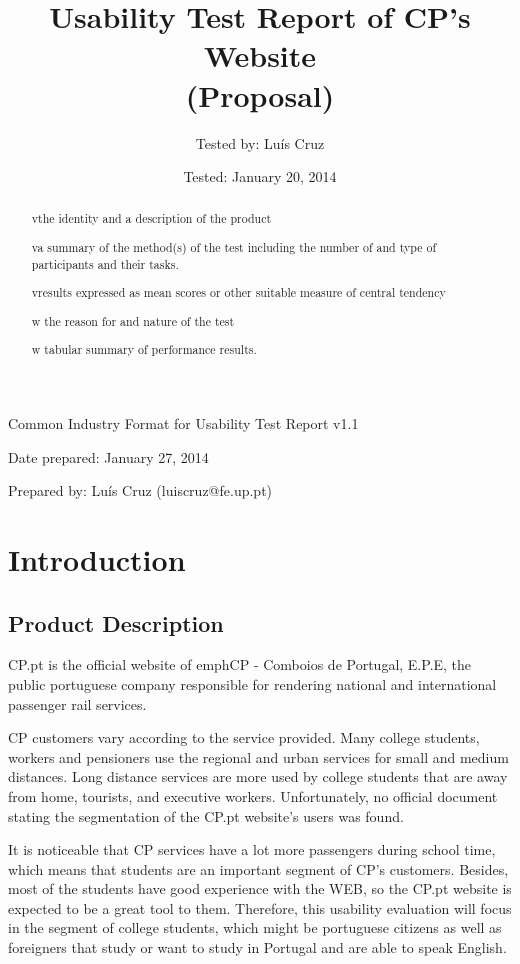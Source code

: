 \documentclass[a4paper]{article}
\title{Usability Test Report of CP's Website\\ (Proposal)}
\author[1]{Tested by: Luís  Cruz}
\affil[1]{MAP-i\\ Joint Doctoral Programme in Computer Science}
\date{Tested: January 20, 2014}
\begin{document}
\maketitle

Common Industry Format for Usability Test Report v1.1

Date prepared: January 27, 2014

Prepared by: Luís Cruz (luiscruz@fe.up.pt)

\begin{abstract}
vthe identity and a description of the product

va summary of the method(s) of the test including the number of and type of participants and their tasks.

vresults expressed as mean scores or other suitable measure of central tendency

w the reason for and nature of the test

w tabular summary of performance results.
\end{abstract}

\section{Introduction}
\subsection{Product Description}

CP.pt is the official website of emph{CP - Comboios de Portugal, E.P.E}, the public portuguese company responsible for rendering national and international passenger rail services.

CP customers vary according to the service provided. Many college students, workers and pensioners use the regional and urban services for small and medium distances. Long distance services are more used by college students that are away from home, tourists, and executive workers. Unfortunately, no official document stating the segmentation of the CP.pt website's users was found.

It is noticeable that CP services have a lot more passengers during school time, which means that students are an important segment of CP's customers. Besides, most of the students have good experience with the WEB, so the CP.pt website is expected to be a great tool to them. Therefore, this usability evaluation will focus in the segment of college students, which might be portuguese citizens as well as foreigners that study or want to study in Portugal and are able to speak English.
\end{document}
